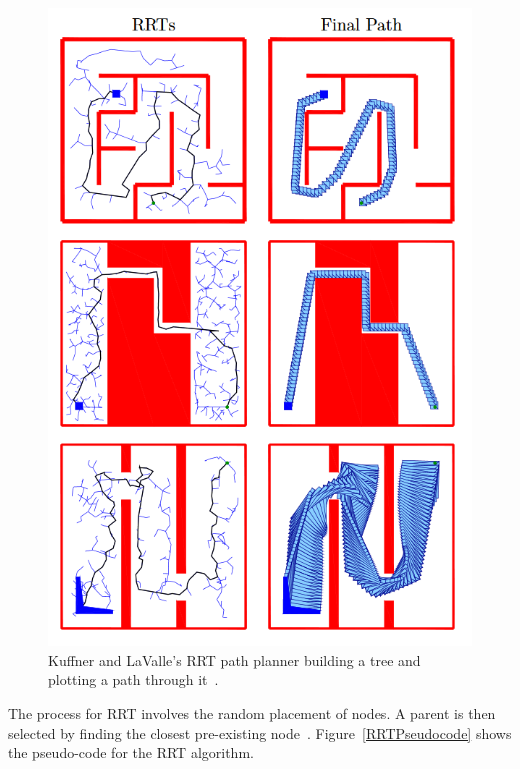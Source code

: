 \documentclass[journal]{IEEEtran}
\begin{document}
\begin{figure}[h]
	\includegraphics[width=1.0\linewidth]{KuffnerRRT.png}
	\caption{ Kuffner and LaValle's RRT path planner building a tree and plotting a path through it~\cite{Kuffner2000}.}
	\label{KuffnerRRT}
\end{figure} 


	


The process for RRT involves the random placement of nodes. A parent is then selected by finding the closest pre-existing node~\cite{Kuffner2000}. Figure~\ref{RRTPseudocode} shows the pseudo-code for the RRT algorithm. 
\end{document}
